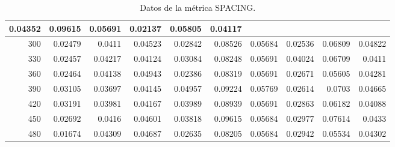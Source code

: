 \begin{table}[h]
\begin{tabular}{|r|r|r|r|r|r|r|r|r|r|}
{        0.04352}    &{\tiny 0.09615}    &{\tiny 0.05691}    &{\tiny 0.02137}    &{\tiny 0.05805}
        &{\tiny 0.04117} \\
        \hline \tiny 300 &{\tiny 0.02479}    &{\tiny 0.0411}    &{\tiny 0.04523}    &{\tiny
        0.02842}    &{\tiny 0.08526}    &{\tiny 0.05684}    &{\tiny 0.02536}    &{\tiny 0.06809}
        &{\tiny 0.04822} \\
        \hline \tiny 330 &{\tiny 0.02457}    &{\tiny 0.04217}    &{\tiny 0.04124}    &{\tiny
        0.03084}    &{\tiny 0.08248}    &{\tiny 0.05691}    &{\tiny 0.04024}    &{\tiny 0.06709}
        &{\tiny 0.0411} \\
        \hline \tiny 360 &{\tiny 0.02464}    &{\tiny 0.04138}    &{\tiny 0.04943}    &{\tiny
        0.02386}    &{\tiny 0.08319}    &{\tiny 0.05691}    &{\tiny 0.02671}    &{\tiny 0.05605}
        &{\tiny 0.04281} \\
        \hline \tiny 390 &{\tiny 0.03105}    &{\tiny 0.03697}    &{\tiny 0.04145}    &{\tiny
        0.04957}    &{\tiny 0.09224}    &{\tiny 0.05769}    &{\tiny 0.02614}    &{\tiny 0.0703}
        &{\tiny 0.04665} \\
        \hline \tiny 420 &{\tiny 0.03191}    &{\tiny 0.03981}    &{\tiny 0.04167}    &{\tiny
        0.03989}    &{\tiny 0.08939}    &{\tiny 0.05691}    &{\tiny 0.02863}    &{\tiny 0.06182}
        &{\tiny 0.04088} \\
        \hline \tiny 450 &{\tiny 0.02692}    &{\tiny 0.0416}    &{\tiny 0.04601}    &{\tiny
        0.03818}    &{\tiny 0.09615}    &{\tiny 0.05684}    &{\tiny 0.02977}    &{\tiny 0.07614}
        &{\tiny 0.0433} \\
        \hline \tiny 480 &{\tiny 0.01674}    &{\tiny 0.04309}    &{\tiny 0.04687}    &{\tiny
        0.02635}    &{\tiny 0.08205}    &{\tiny 0.05684}    &{\tiny 0.02942}    &{\tiny 0.05534}
        &{\tiny 0.04302} \\
        \hline
    \end{tabular}
    \caption{Datos de la m\'etrica SPACING.}
    \label{tabA5}
\end{table}

